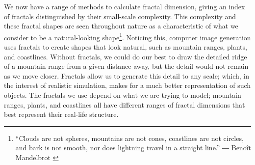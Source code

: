 \begin{exmp}
We now have a range of methods to calculate fractal dimension, giving an index of fractals distinguished by their small-scale complexity. 
This complexity and these fractal shapes are seen throughout nature as a characteristic of what we consider to be a natural-looking shape\footnote{“Clouds are not spheres, mountains are not cones, coastlines are not circles, and bark is not smooth, nor does lightning travel in a straight line.”
― Benoît Mandelbrot \cite{mandelbrot1983fractal}}.
Noticing this, computer image generation uses fractals to create shapes that look natural, such as mountain ranges, plants, and coastlines. Without fractals, we could do our best to draw the detailed ridge of a mountain range from a given distance away, but the detail would not remain as we move closer. Fractals allow us to generate this detail to any scale; which, in the interest of realistic simulation, makes for a much better representation of such objects. The fractals we use depend on what we are trying to model; mountain ranges, plants, and coastlines all have different ranges of fractal dimensions that best represent their real-life structure. \cite{Haeseler2012}
\end{exmp}



